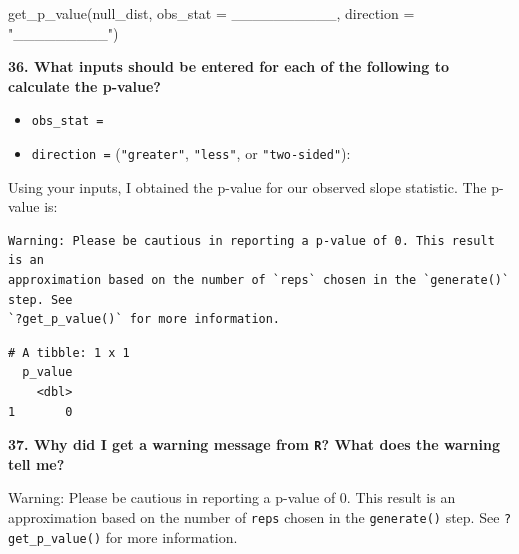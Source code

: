 \documentclass[
  letterpaper,
  DIV=11,
  numbers=noendperiod]{scrartcl}
\newenvironment{Shaded}{\begin{snugshade}}{\end{snugshade}}
\newcommand{\AttributeTok}[1]{\textcolor[rgb]{0.40,0.45,0.13}{#1}}
\newcommand{\FunctionTok}[1]{\textcolor[rgb]{0.28,0.35,0.67}{#1}}
\newcommand{\NormalTok}[1]{\textcolor[rgb]{0.00,0.23,0.31}{#1}}
\newcommand{\StringTok}[1]{\textcolor[rgb]{0.13,0.47,0.30}{#1}}
\providecommand{\tightlist}{%
  \setlength{\itemsep}{0pt}\setlength{\parskip}{0pt}}\usepackage{longtable,booktabs,array}
\begin{document}
\begin{Shaded}
\begin{Highlighting}[]
\FunctionTok{get\_p\_value}\NormalTok{(null\_dist, }
            \AttributeTok{obs\_stat =}\NormalTok{ \_\_\_\_\_\_\_\_\_\_, }
            \AttributeTok{direction =} \StringTok{"\_\_\_\_\_\_\_\_\_"}\NormalTok{)}
\end{Highlighting}
\end{Shaded}

\textbf{36. What inputs should be entered for each of the following to
calculate the p-value?}

\begin{itemize}
\tightlist
\item
  \texttt{obs\_stat\ =} 
\end{itemize}

\vspace{.2cm}

\begin{itemize}
\tightlist
\item
  \texttt{direction\ =} (\texttt{"greater"}, \texttt{"less"}, or
  \texttt{"two-sided"}): 
\end{itemize}

\vspace{.2cm}

Using your inputs, I obtained the p-value for our observed slope
statistic. The p-value is:

\begin{verbatim}
Warning: Please be cautious in reporting a p-value of 0. This result is an
approximation based on the number of `reps` chosen in the `generate()` step. See
`?get_p_value()` for more information.
\end{verbatim}

\begin{verbatim}
# A tibble: 1 x 1
  p_value
    <dbl>
1       0
\end{verbatim}

\vspace{0.2in}

\textbf{37. Why did I get a warning message from \texttt{R}? What does
the warning tell me?}

Warning: Please be cautious in reporting a p-value of 0. This result is
an approximation based on the number of \texttt{reps} chosen in the
\texttt{generate()} step. See \texttt{?get\_p\_value()} for more
information.

\end{document}
